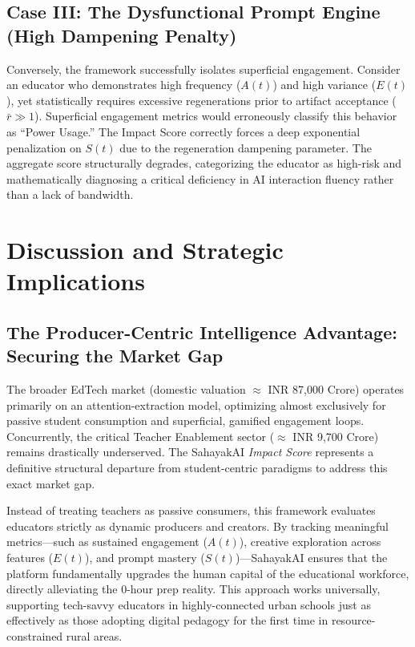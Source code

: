 \documentclass[11pt,a4paper]{article}
\begin{document}
\subsection{Case III: The Dysfunctional Prompt Engine (High Dampening Penalty)}
Conversely, the framework successfully isolates superficial engagement. Consider an educator who demonstrates high frequency ($A(t)$) and high variance ($E(t)$), yet statistically requires excessive regenerations prior to artifact acceptance ($\bar{r} \gg 1$). Superficial engagement metrics would erroneously classify this behavior as ``Power Usage.'' The Impact Score correctly forces a deep exponential penalization on $S(t)$ due to the regeneration dampening parameter. The aggregate score structurally degrades, categorizing the educator as high-risk and mathematically diagnosing a critical deficiency in AI interaction fluency rather than a lack of bandwidth.

\section{Discussion and Strategic Implications}

\subsection{The Producer-Centric Intelligence Advantage: Securing the Market Gap}
The broader EdTech market (domestic valuation $\approx$ INR 87,000 Crore) operates primarily on an attention-extraction model, optimizing almost exclusively for passive student consumption and superficial, gamified engagement loops. Concurrently, the critical Teacher Enablement sector ($\approx$ INR 9,700 Crore) remains drastically underserved. The SahayakAI \textit{Impact Score} represents a definitive structural departure from student-centric paradigms to address this exact market gap.

Instead of treating teachers as passive consumers, this framework evaluates educators strictly as dynamic producers and creators. By tracking meaningful metrics---such as sustained engagement ($A(t)$), creative exploration across features ($E(t)$), and prompt mastery ($S(t)$)---SahayakAI ensures that the platform fundamentally upgrades the human capital of the educational workforce, directly alleviating the 0-hour prep reality. This approach works universally, supporting tech-savvy educators in highly-connected urban schools just as effectively as those adopting digital pedagogy for the first time in resource-constrained rural areas.
\end{document}
